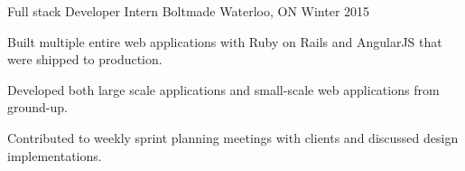 \begin{cventries}
  \cventry
    {Full stack Developer Intern} %
    {Boltmade} %
    {Waterloo, ON} %
    {Winter 2015} %
    {
      \begin{cvitems} %
      \item {Built multiple entire web applications with Ruby on Rails and AngularJS that were shipped to production.}
      \item {Developed both large scale applications and small-scale web applications from ground-up.}
      \item {Contributed to weekly sprint planning meetings with clients and discussed design implementations.}
  \end{cvitems} 
    }

\end{cventries}
